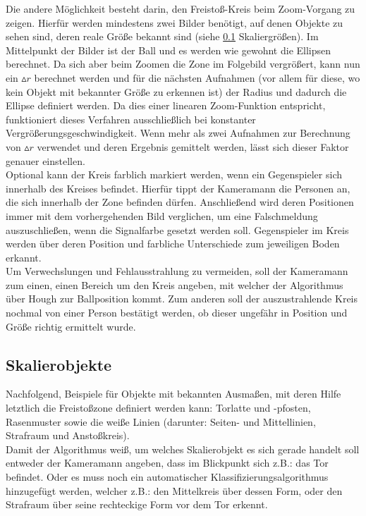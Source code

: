 \documentclass{ezb}
\begin{document}
Die andere Möglichkeit besteht darin, den Freistoß-Kreis beim Zoom-Vorgang zu zeigen. Hierfür werden mindestens zwei Bilder benötigt, auf denen Objekte zu sehen sind, deren reale Größe bekannt sind (siehe \ref{b:skaliergr} Skaliergrößen). Im Mittelpunkt der Bilder ist der Ball und es werden wie gewohnt die Ellipsen berechnet. Da sich aber beim Zoomen die Zone im Folgebild vergrößert, kann nun ein $\vartriangle r$ berechnet werden und für die nächsten Aufnahmen (vor allem für diese, wo kein Objekt mit bekannter Größe zu erkennen ist) der Radius und dadurch die Ellipse definiert werden. Da dies einer linearen Zoom-Funktion entspricht, funktioniert dieses Verfahren ausschließlich bei konstanter Vergrößerungsgeschwindigkeit. Wenn mehr als zwei Aufnahmen zur Berechnung von $\vartriangle r$ verwendet und deren Ergebnis gemittelt werden, lässt sich dieser Faktor genauer einstellen.\\
\linebreak
Optional kann der Kreis farblich markiert werden, wenn ein Gegenspieler sich innerhalb des Kreises befindet. Hierfür tippt der Kameramann die Personen an, die sich innerhalb der Zone befinden dürfen. Anschließend wird deren Positionen immer mit dem vorhergehenden Bild verglichen, um eine Falschmeldung auszuschließen, wenn die Signalfarbe gesetzt werden soll. Gegenspieler im Kreis werden über deren Position und farbliche Unterschiede zum jeweiligen Boden erkannt.\\
\linebreak
Um Verwechslungen und Fehlausstrahlung zu vermeiden, soll der Kameramann zum einen, einen Bereich um den Kreis angeben, mit welcher der Algorithmus über Hough zur Ballposition kommt. Zum anderen soll der auszustrahlende Kreis nochmal von einer Person bestätigt werden, ob dieser ungefähr in Position und Größe richtig ermittelt wurde.
\subsection{Skalierobjekte}\label{b:skaliergr}
Nachfolgend, Beispiele für Objekte mit bekannten Ausmaßen, mit deren Hilfe letztlich die Freistoßzone definiert werden kann: Torlatte und -pfosten, Rasenmuster sowie die weiße Linien (darunter: Seiten- und Mittellinien, Strafraum und Anstoßkreis).\\
\linebreak
Damit der Algorithmus weiß, um welches Skalierobjekt es sich gerade handelt soll entweder der Kameramann angeben, dass im Blickpunkt sich z.B.: das Tor befindet. Oder es muss noch ein automatischer Klassifizierungsalgorithmus hinzugefügt werden, welcher z.B.: den Mittelkreis über dessen Form, oder den Strafraum über seine rechteckige Form vor dem Tor erkennt.
\end{document}
